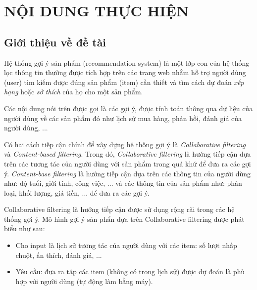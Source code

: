 \documentclass{article}[14pt]
\begin{document}
    \section{NỘI DUNG THỰC HIỆN}
    {

    
    \subsection{Giới thiệu về đề tài}
    
    
    
      Hệ thống gợi ý sản phẩm (recommendation system) là một lớp con của hệ thống
      lọc thông tin thường được tích hợp trên các trang web nhằm hỗ trợ 
      người dùng (user) tìm kiếm được đúng sản phẩm (item) cần thiết  
      và tìm cách dự đoán \textit{xếp hạng} hoặc \textit{sở thích} 
      của họ cho một sản phẩm.
      
      Các nội dung nói trên được gọi là các gợi ý, được tính toán thông qua dữ liệu
      của người dùng về các sản phẩm đó như lịch sử mua hàng, phản hồi, đánh giá của
      người dùng, ...
  
      Có hai cách tiếp cận chính để xây dựng hệ thống gợi ý là 
      \textit{Collaborative filtering} và \textit{Content-based filtering}.
      Trong đó, \textit{Collaborative filtering} là hướng tiếp cận dựa trên các 
      tương tác của người dùng với sản phẩm trong quá khứ để đưa ra các gợi ý. 
      \textit{Content-base filtering} là hướng tiếp cận dựa trên các thông tin 
      của người dùng như: độ tuổi, giới tính, công việc, ... và các thông tin 
      của sản phẩm như: phân loại, khối lượng, giá tiền, ... để đưa ra các gợi ý.
  
      Collaborative filtering là hướng tiếp cận được sử dụng rộng rãi trong các 
      hệ thống gợi ý. 
      Mô hình gợi ý sản phẩn dựa trên Collaborative filtering được phát biểu như 
      sau:
      \begin{itemize}
          \item Cho input là lịch sử tương tác của người dùng với các item:
              số lượt nhấp chuột, ấn thích, đánh giá, ... 
          \item Yêu cầu: đưa ra tập các item (không có trong lịch sử) 
          được dự đoán là phù hợp với người dùng (tự động làm bằng máy).
      \end{itemize}
  
}
\end{document}
